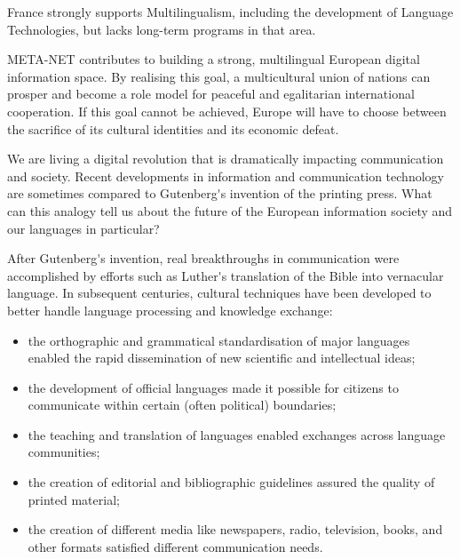 \begin{multicols}{2}
France strongly supports Multilingualism, including the development of
Language Technologies, but lacks long-term programs in that area.

META-NET contributes to building a strong, multilingual European
digital information space. By realising this goal, a multicultural
union of nations can prosper and become a role model for peaceful and
egalitarian international cooperation. If this goal cannot be
achieved, Europe will have to choose between the sacrifice of its cultural
identities and its economic defeat.
\end{multicols}

\clearpage


\begin{multicols}{2}

We are living a digital revolution that is dramatically impacting communication and society. Recent developments in information and communication technology are sometimes compared to Gutenberg{\mbox '}s invention of the printing press. What can this analogy tell us about the future of the European information society and our languages in particular?


After Gutenberg{\mbox '}s invention, real breakthroughs in communication were accomplished by efforts such as Luther{\mbox '}s translation of the Bible into vernacular language. In subsequent centuries, cultural techniques have been developed to better handle language processing and knowledge exchange:

\begin{itemize}
\item the orthographic and grammatical standardisation of major languages enabled the rapid dissemination of new scientific and intellectual ideas;
\item the development of official languages made it possible for citizens to communicate within certain (often political) boundaries;
\item the teaching and translation of languages enabled exchanges across language communities;
\item the creation of editorial and bibliographic guidelines assured the quality of printed material;
\item the creation of different media like newspapers, radio, television, books, and other formats satisfied different communication needs. 
\end{itemize}


\end{multicols}
